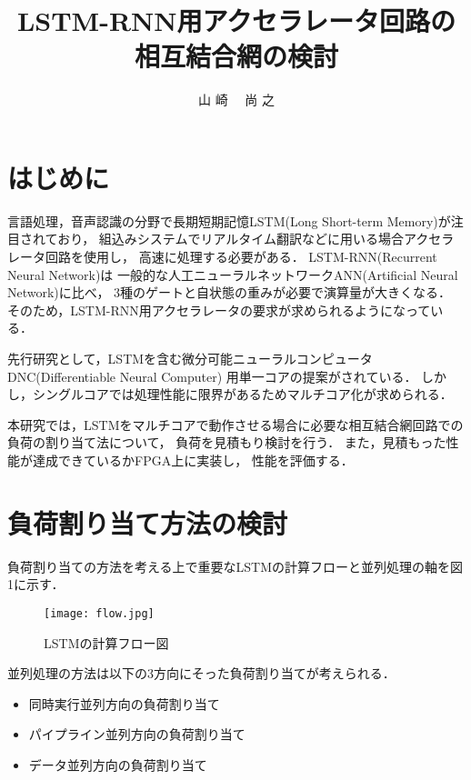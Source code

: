 \documentclass[a4j]{jarticle}
\title{LSTM-RNN用アクセラレータ回路の相互結合網の検討}
\author{山 崎 ~~尚 之}
\begin{document}
\begin{Abstract}

 \section{はじめに}

言語処理，音声認識の分野で長期短期記憶LSTM(Long Short-term Memory)が注目されており，
組込みシステムでリアルタイム翻訳などに用いる場合アクセラレータ回路を使用し，
高速に処理する必要がある．
LSTM-RNN(Recurrent Neural Network)は
一般的な人工ニューラルネットワークANN(Artificial Neural Network)に比べ，
3種のゲートと自状態の重みが必要で演算量が大きくなる．
そのため，LSTM-RNN用アクセラレータの要求が求められるようになっている．

先行研究として，LSTMを含む微分可能ニューラルコンピュータDNC(Differentiable Neural Computer)
用単一コアの提案がされている\cite{bib:pre-method}．
しかし，シングルコアでは処理性能に限界があるためマルチコア化が求められる．

本研究では，LSTMをマルチコアで動作させる場合に必要な相互結合網回路での負荷の割り当て法について，
負荷を見積もり検討を行う．
また，見積もった性能が達成できているかFPGA上に実装し，
性能を評価する．



 \section{負荷割り当て方法の検討}
 負荷割り当ての方法を考える上で重要なLSTMの計算フローと並列処理の軸を図1に示す．
 \begin{figure}[h]
  \centering
  \texttt{[image: flow.jpg]}
  \caption{LSTMの計算フロー図}
 \end{figure}


 並列処理の方法は以下の3方向にそった負荷割り当てが考えられる．

 \begin{itemize}
  \item 同時実行並列方向の負荷割り当て
  \item パイプライン並列方向の負荷割り当て
  \item データ並列方向の負荷割り当て
 \end{itemize}




\end{Abstract}
\end{document}
